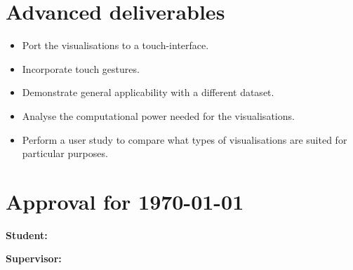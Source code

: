 \documentclass[a4paper]{article}
\begin{document}
	\section{Advanced deliverables} {
	
		\begin{itemize}	
			\item Port the visualisations to a touch-interface.
			\item Incorporate touch gestures.
			\item Demonstrate general applicability with a different dataset.
			\item Analyse the computational power needed for the visualisations.
			\item Perform a user study to compare what types of visualisations are suited for particular purposes.
		\end{itemize}
	
	}
	
	\section{Approval for \today} {
	
		\vspace{1em}\par
		\textbf{Student:} 
		\vspace{2em}\par
		\textbf{Supervisor:}
		
	}
	
\end{document}
